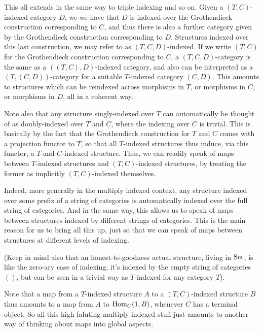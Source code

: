 This all extends in the same way to triple indexing and so on. Given a $(T, C)$-indexed category $D$, we we have that $D$ is indexed over the Grothendieck construction corresponding to $C$, and thus there is also a further category given by the Grothendieck construction corresponding to $D$. Structures indexed over this last construction, we may refer to as $(T, C, D)$-indexed. If we write $(T, C)$ for the Grothendieck construction corresponding to $C$, a $(T, C, D)$-category is the same as a $((T, C), D)$-indexed category, and also can be interpreted as a $(T, (C, D))$-category for a suitable $T$-indexed category $(C, D)$. This amounts to structures which can be reindexed across morphisms in $T$, or  morphisms in $C$, or morphisms in $D$, all in a coherent way.


Note also that any structure singly-indexed over $T$ can automatically be thought of as doubly-indexed over $T$ and $C$, where the indexing over $C$ is trivial. This is basically by the fact that the Grothendieck construction for $T$ and $C$ comes with a projection functor to $T$, so that all $T$-indexed structures thus induce, via this functor, a $T$-and-$C$-indexed structure. Thus, we can readily speak of maps between $T$-indexed structures and $(T, C)$-indexed structures, by treating the former as implicitly $(T, C)$-indexed themselves.

Indeed, more generally in the multiply indexed context, any structure indexed over some prefix of a string of categories is automatically indexed over the full string of categories. And in the same way, this allows us to speak of maps between structures indexed by different strings of categories. This is the main reason for us to bring all this up, just so that we can speak of maps between structures at different levels of indexing.

(Keep in mind also that an honest-to-goodness actual structure, living in $\mathrm{Set}$, is like the zero-ary case of indexing; it's indexed by the empty string of categories $()$, but can be seen in a trivial way as $T$-indexed for any category $T$).

Note that a map from a $T$-indexed structure $A$ to a $(T, C)$-indexed structure $B$ thus amounts to a map from $A$ to $\operatorname{Hom}_C(1, B)$, whenever $C$ has a terminal object. So all this high-faluting multiply indexed stuff just amounts to another way of thinking about maps into global aspects.
